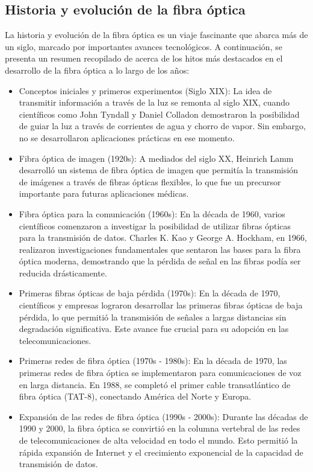 \documentclass[10.5pt]{article}
\begin{document}
    \subsection{Historia y evolución de la fibra óptica}
    La historia y evolución de la fibra óptica es un viaje fascinante que abarca más de un siglo, marcado por importantes avances tecnológicos. A continuación, se presenta un resumen recopilado de \cite{acosta} acerca de los hitos más destacados en el desarrollo de la fibra óptica a lo largo de los años:
    \begin{itemize}
        \item Conceptos iniciales y primeros experimentos (Siglo XIX): La idea de transmitir información a través de la luz se remonta al siglo XIX, cuando científicos como John Tyndall y Daniel Colladon demostraron la posibilidad de guiar la luz a través de corrientes de agua y chorro de vapor. Sin embargo, no se desarrollaron aplicaciones prácticas en ese momento.
        \item Fibra óptica de imagen (1920s): A mediados del siglo XX, Heinrich Lamm desarrolló un sistema de fibra óptica de imagen que permitía la transmisión de imágenes a través de fibras ópticas flexibles, lo que fue un precursor importante para futuras aplicaciones médicas.
        \item Fibra óptica para la comunicación (1960s): En la década de 1960, varios científicos comenzaron a investigar la posibilidad de utilizar fibras ópticas para la transmisión de datos. Charles K. Kao y George A. Hockham, en 1966, realizaron investigaciones fundamentales que sentaron las bases para la fibra óptica moderna, demostrando que la pérdida de señal en las fibras podía ser reducida drásticamente.
        \item Primeras fibras ópticas de baja pérdida (1970s): En la década de 1970, científicos y empresas lograron desarrollar las primeras fibras ópticas de baja pérdida, lo que permitió la transmisión de señales a largas distancias sin degradación significativa. Este avance fue crucial para su adopción en las telecomunicaciones.
        \item Primeras redes de fibra óptica (1970s - 1980s): En la década de 1970, las primeras redes de fibra óptica se implementaron para comunicaciones de voz en larga distancia. En 1988, se completó el primer cable transatlántico de fibra óptica (TAT-8), conectando América del Norte y Europa.
        \item Expansión de las redes de fibra óptica (1990s - 2000s): Durante las décadas de 1990 y 2000, la fibra óptica se convirtió en la columna vertebral de las redes de telecomunicaciones de alta velocidad en todo el mundo. Esto permitió la rápida expansión de Internet y el crecimiento exponencial de la capacidad de transmisión de datos.

\end{itemize}
\end{document}
